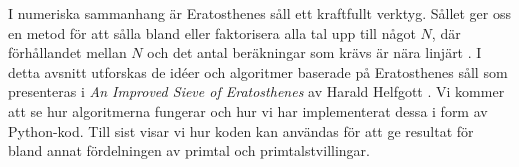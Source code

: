 
I numeriska sammanhang är Eratosthenes såll ett kraftfullt verktyg.
Sållet ger oss en metod för att sålla bland eller faktorisera alla tal upp till något $N$,
där förhållandet mellan $N$ och det antal beräkningar som krävs är nära linjärt \cite[s. 333]{HaraldSieve}.
I detta avsnitt utforskas de idéer och algoritmer baserade på Eratosthenes såll som presenteras i \textit{An Improved Sieve of Eratosthenes} av Harald Helfgott \cite{HaraldSieve}.
Vi kommer att se hur algoritmerna fungerar och hur vi har implementerat dessa i form av Python-kod.
Till sist visar vi hur koden kan användas för att ge resultat för bland annat fördelningen av primtal och primtalstvillingar.



